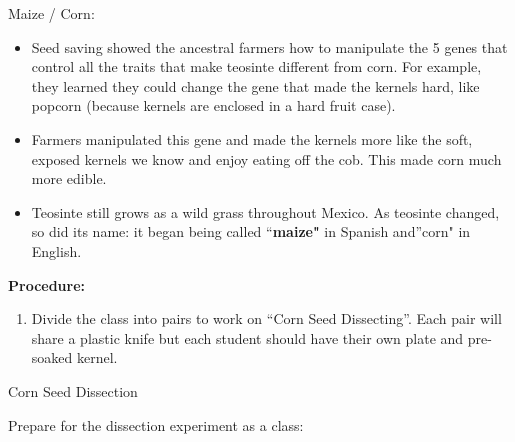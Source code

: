 \documentclass[12pt,]{article}
\providecommand{\tightlist}{%
  \setlength{\itemsep}{0pt}\setlength{\parskip}{0pt}}
\begin{document}
{Maize / Corn}:

\begin{itemize}
\tightlist
\item
  Seed saving showed the ancestral farmers how to manipulate the 5 genes that control all the traits that make teosinte different from corn. For example, they learned they could change the gene that made the kernels hard, like popcorn (because kernels are enclosed in a hard fruit case).
\item
  Farmers manipulated this gene and made the kernels more like the soft, exposed kernels we know and enjoy eating off the cob. This made corn much more edible.
\item
  Teosinte still grows as a wild grass throughout Mexico. As teosinte changed, so did its name: it began being called ``\textbf{maize"} in Spanish and''corn" in English.
\end{itemize}

\textbf{Procedure:}

\begin{enumerate}
\def\labelenumi{\arabic{enumi}.}
\tightlist
\item
  Divide the class into pairs to work on ``Corn Seed Dissecting''. Each pair will share a plastic knife but each student should have their own plate and pre-soaked kernel.
\end{enumerate}

{Corn Seed Dissection}

Prepare for the dissection experiment as a class:
\end{document}
